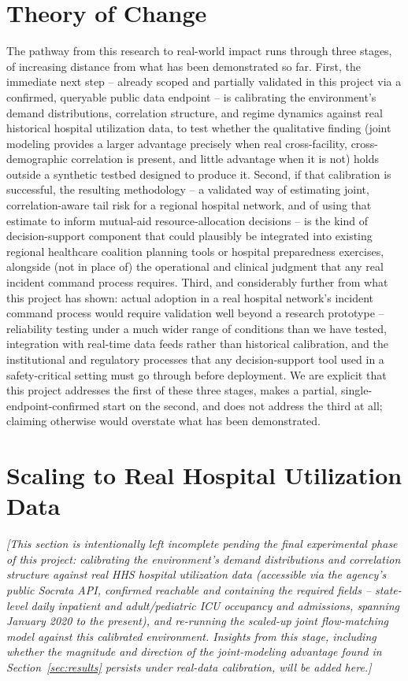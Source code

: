 \documentclass[11pt]{article}
\begin{document}
\section{Theory of Change}

The pathway from this research to real-world impact runs through three stages, of increasing distance from what has been demonstrated so far. First, the immediate next step -- already scoped and partially validated in this project via a confirmed, queryable public data endpoint -- is calibrating the environment's demand distributions, correlation structure, and regime dynamics against real historical hospital utilization data, to test whether the qualitative finding (joint modeling provides a larger advantage precisely when real cross-facility, cross-demographic correlation is present, and little advantage when it is not) holds outside a synthetic testbed designed to produce it. Second, if that calibration is successful, the resulting methodology -- a validated way of estimating joint, correlation-aware tail risk for a regional hospital network, and of using that estimate to inform mutual-aid resource-allocation decisions -- is the kind of decision-support component that could plausibly be integrated into existing regional healthcare coalition planning tools or hospital preparedness exercises, alongside (not in place of) the operational and clinical judgment that any real incident command process requires. Third, and considerably further from what this project has shown: actual adoption in a real hospital network's incident command process would require validation well beyond a research prototype -- reliability testing under a much wider range of conditions than we have tested, integration with real-time data feeds rather than historical calibration, and the institutional and regulatory processes that any decision-support tool used in a safety-critical setting must go through before deployment. We are explicit that this project addresses the first of these three stages, makes a partial, single-endpoint-confirmed start on the second, and does not address the third at all; claiming otherwise would overstate what has been demonstrated.

\section{Scaling to Real Hospital Utilization Data}
\label{sec:realdata}

\textit{[This section is intentionally left incomplete pending the final experimental phase of this project: calibrating the environment's demand distributions and correlation structure against real HHS hospital utilization data (accessible via the agency's public Socrata API, confirmed reachable and containing the required fields -- state-level daily inpatient and adult/pediatric ICU occupancy and admissions, spanning January 2020 to the present), and re-running the scaled-up joint flow-matching model against this calibrated environment. Insights from this stage, including whether the magnitude and direction of the joint-modeling advantage found in Section~\ref{sec:results} persists under real-data calibration, will be added here.]}
\end{document}
